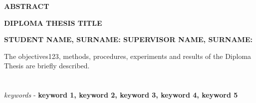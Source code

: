 \begin{center}  \Large{\textbf{ABSTRACT}}  \end{center}
\begin{center}  \Large{\textbf{DIPLOMA THESIS TITLE}}  \end{center}
\vspace{3pt}
\begin{center}  \large{\textbf{STUDENT NAME, SURNAME: \hspace{50pt} SUPERVISOR NAME, SURNAME:}}  \end{center}
\vspace{10pt}
\noindent
The objectives123, methods, procedures, experiments and results of the Diploma Thesis are briefly described.\\\\
\noindent
\vspace{0.3cm}
\\ \textit{keywords} - \textbf{keyword 1, keyword 2, keyword 3, keyword 4, keyword 5} 